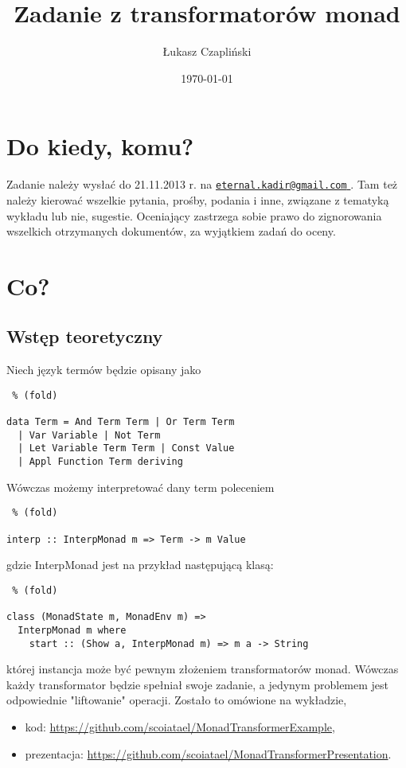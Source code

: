 \documentclass[11pt,wide]{mwart}
\title{Zadanie z transformatorów monad}
\author{Łukasz Czapliński}
\date{\today}
\begin{document}
\maketitle
\section{Do kiedy, komu?}
Zadanie należy wysłać do 21.11.2013 r. na \href{mailto:eternal.kadir@gmail.com}{\nolinkurl{eternal.kadir@gmail.com} }. Tam też należy kierować wszelkie pytania, prośby, podania i inne, związane z tematyką wykładu lub nie, sugestie. Oceniający zastrzega sobie prawo do zignorowania wszelkich otrzymanych dokumentów, za wyjątkiem zadań do oceny. 
\section{Co?}
\subsection{Wstęp teoretyczny}
Niech język termów będzie opisany jako \begin{lstlisting} % (fold)

data Term = And Term Term | Or Term Term 
  | Var Variable | Not Term 
  | Let Variable Term Term | Const Value
  | Appl Function Term deriving

\end{lstlisting}Wówczas możemy interpretować dany term poleceniem \begin{lstlisting} % (fold)

interp :: InterpMonad m => Term -> m Value

\end{lstlisting} gdzie InterpMonad jest na przykład następującą klasą: \begin{lstlisting} % (fold)

class (MonadState m, MonadEnv m) => 
  InterpMonad m where
    start :: (Show a, InterpMonad m) => m a -> String

  \end{lstlisting} której instancja może być pewnym złożeniem transformatorów monad. Wówczas każdy transformator będzie spełniał swoje zadanie, a jedynym problemem jest odpowiednie "liftowanie" operacji. Zostało to omówione na wykładzie,\begin{itemize}\itemsep2pt
  \item kod: \url{https://github.com/scoiatael/MonadTransformerExample},
  \item prezentacja: \url{https://github.com/scoiatael/MonadTransformerPresentation}.
\end{itemize}
\end{document}
